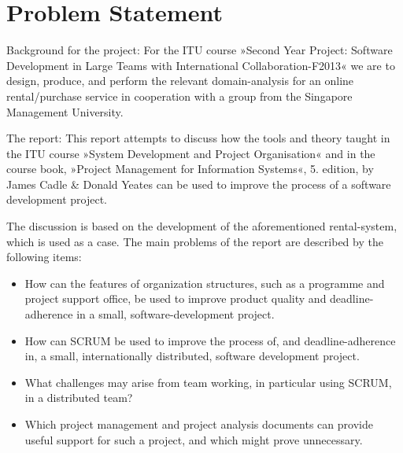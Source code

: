 \section{Problem Statement}
\label{sec:problemstatement}
Background for the project:
For the ITU course »Second Year Project: Software Development in Large Teams with
International Collaboration-F2013«
we are to design, produce, and perform the relevant domain-analysis for
an online rental/purchase service in cooperation with a group from the Singapore
Management University.

The report:
This report attempts to discuss how the tools and theory taught in the
ITU course »System Development and Project Organisation« and in the
course book, »Project Management for Information Systems«, 5. edition, by 
James Cadle \& Donald Yeates can be used to improve the process of a software development project.

The discussion is based on the development of the aforementioned
rental-system, which is used as a case.
The main problems of the report are described by the following items:
\begin{itemize}
\item How can the features of organization structures, such as a
programme and project support office, be used to improve
product quality and deadline-adherence in a small,
software-development project.

\item How can SCRUM be used to improve the process of, and 
deadline-adherence in, a small, internationally distributed,
software development project.

\item What challenges may arise from team working, in particular
using SCRUM, in a distributed team?

\item Which project management and project analysis documents can
provide useful support for such a project, and which might
prove unnecessary.
\end{itemize}
